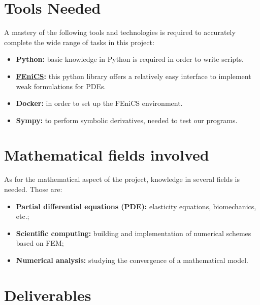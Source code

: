 \section{Tools Needed}

A mastery of the following tools and technologies is required to accurately complete the wide range of tasks in this project:
\begin{itemize}
    \item \textbf{Python:} basic knowledge in Python is required in order to write scripts. 
    \item \textbf{\href{https://fenicsproject.org/}{FEniCS}:} this python library offers a relatively easy interface to implement weak formulations for PDEs.
    \item \textbf{Docker:} in order to set up the FEniCS environment.
    \item \textbf{Sympy:} to perform symbolic derivatives, needed to test our programs.
\end{itemize}

\section{Mathematical fields involved}

As for the mathematical aspect of the project, knowledge in several fields is needed. Those are:
\begin{itemize}
    \item \textbf{Partial differential equations (PDE):} elasticity equations, biomechanics, etc.;
    \item \textbf{Scientific computing:} building and implementation of numerical schemes based on FEM;
    \item \textbf{Numerical analysis:} studying the convergence of a mathematical model.
\end{itemize}


\section{Deliverables}


